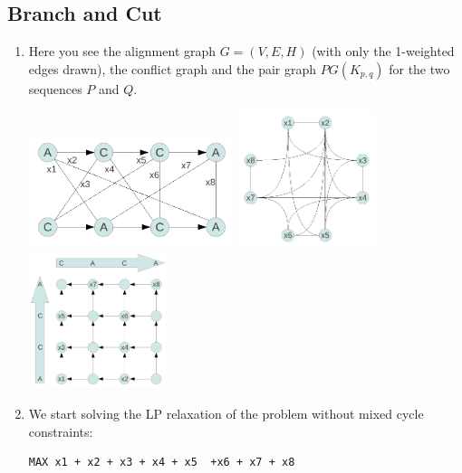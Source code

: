 \documentclass[a4paper, oneside]{scrartcl}
\begin{document}
\subsection{Branch and Cut}

\renewcommand{\labelenumi}{\alph{enumi})}
\begin{enumerate}
  \item 
  Here you see the alignment graph $G=(V,E,H)$ (with only the 1-weighted edges drawn), 
  the conflict graph and the pair graph $PG(K_{p,q})$ for the two sequences $P$ and $Q$.
  
  \includegraphics[width=6cm]{ex9_align_graph.pdf}
  \includegraphics[width=4cm]{ex9_conflict_graph.pdf}
  \includegraphics[width=4cm]{ex9_pair_graph.pdf}

  \item
  We start solving the LP relaxation of the problem without mixed cycle constraints:
  \begin{verbatim}
MAX x1 + x2 + x3 + x4 + x5  +x6 + x7 + x8


\end{verbatim}
\end{enumerate}
\end{document}
